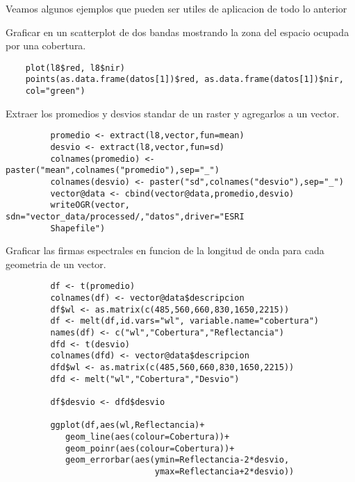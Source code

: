 \documentclass[a4paper]{article}
\begin{document}
 Veamos algunos ejemplos que pueden ser utiles de aplicacion de todo lo anterior

 \begin{exa}
    Graficar en un scatterplot de dos bandas mostrando la zona del espacio 
    ocupada por una cobertura.
 \begin{lstlisting}
    plot(l8$red, l8$nir)
    points(as.data.frame(datos[1])$red, as.data.frame(datos[1])$nir,
    col="green")
 \end{lstlisting}
 \end{exa}

 \begin{exa}
     Extraer los promedios y desvios standar de un raster y agregarlos a un
     vector.
     \begin{lstlisting}
         promedio <- extract(l8,vector,fun=mean)
         desvio <- extract(l8,vector,fun=sd)
         colnames(promedio) <- paster("mean",colnames("promedio"),sep="_")
         colnames(desvio) <- paster("sd",colnames("desvio"),sep="_")
         vector@data <- cbind(vector@data,promedio,desvio)
         writeOGR(vector, sdn="vector_data/processed/,"datos",driver="ESRI
         Shapefile")
     \end{lstlisting}
 \end{exa}

 \begin{exa}
     Graficar las firmas espectrales en funcion de la longitud de onda para cada
     geometria de un vector.
     \begin{lstlisting}
         df <- t(promedio)
         colnames(df) <- vector@data$descripcion
         df$wl <- as.matrix(c(485,560,660,830,1650,2215))
         df <- melt(df,id.vars="wl", variable.name="cobertura")
         names(df) <- c("wl","Cobertura","Reflectancia")
         dfd <- t(desvio)
         colnames(dfd) <- vector@data$descripcion
         dfd$wl <- as.matrix(c(485,560,660,830,1650,2215))
         dfd <- melt("wl","Cobertura","Desvio")

         df$desvio <- dfd$desvio

         ggplot(df,aes(wl,Reflectancia)+
            geom_line(aes(colour=Cobertura))+
            geom_poinr(aes(colour=Cobertura))+
            geom_errorbar(aes(ymin=Reflectancia-2*desvio,
                              ymax=Reflectancia+2*desvio))
     \end{lstlisting}
 \end{exa}
\end{document}
